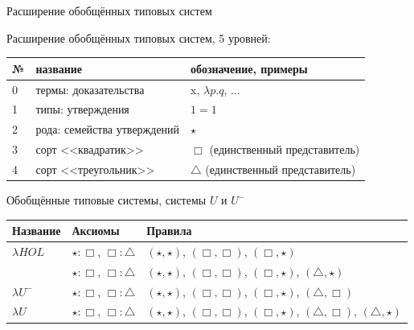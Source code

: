 \documentclass[aspectratio=169,dvipsnames,usenames]{beamer}
\begin{document}
\begin{frame}{Расширение обобщённых типовых систем}

Расширение обобщённых типовых систем, 5 уровней:

\vspace{1cm}
\begin{tabular}{lll}
№ & название & обозначение, примеры\\\hline
0 & термы: доказательства & x, $\lambda p.q$, ...\\
1 & типы: утверждения & $1=1$ \\
2 & рода: семейства утверждений & $\star$ \\
3 & сорт <<квадратик>> & $\Box$ (единственный представитель) \\
4 & сорт <<треугольник>> & $\triangle$ (единственный представитель)
\end{tabular}

\end{frame}
\begin{frame}{Обобщённые типовые системы, системы $U$ и $U^-$}

\begin{tabular}{lll}
Название & Аксиомы & Правила\\\hline
$\lambda HOL$ & $\star : \Box$, $\Box : \triangle$ & $(\star,\star)$, $(\Box,\Box)$, $(\Box,\star)$ \\
             & $\star : \Box$, $\Box : \triangle$ & $(\star,\star)$, $(\Box,\Box)$, $(\Box,\star)$, $(\triangle,\star)$ \\\hline
$\lambda U^-$ & $\star : \Box$, $\Box : \triangle$ & $(\star,\star)$, $(\Box,\Box)$, $(\Box,\star)$, $(\triangle,\Box)$ \\
$\lambda U$ & $\star : \Box$, $\Box : \triangle$ & $(\star,\star)$, $(\Box,\Box)$, $(\Box,\star)$, $(\triangle,\Box)$, $(\triangle,\star)$ 
\end{tabular}

\end{frame}
\end{document}
